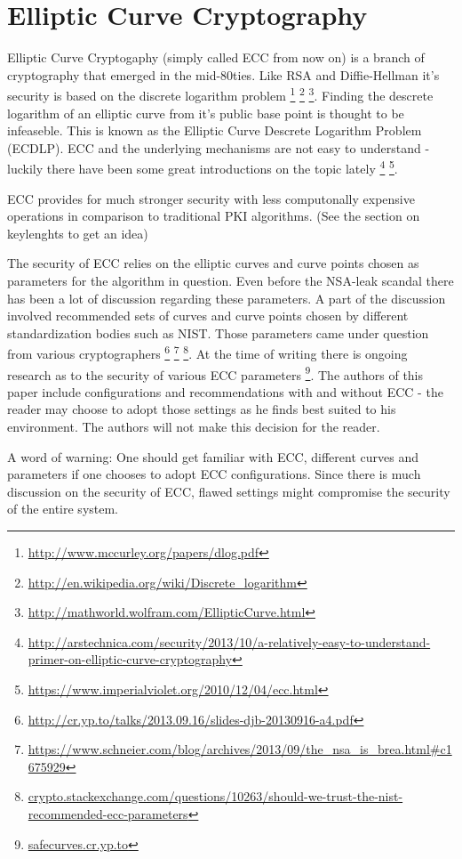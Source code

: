 \section{Elliptic Curve Cryptography}

Elliptic Curve Cryptogaphy (simply called ECC from now on) is a branch of 
cryptography that emerged in the mid-80ties. Like RSA and Diffie-Hellman 
it's security is based on the discrete logarithm problem
\footnote{\url{http://www.mccurley.org/papers/dlog.pdf}} 
\footnote{\url{http://en.wikipedia.org/wiki/Discrete_logarithm}}
\footnote{\url{http://mathworld.wolfram.com/EllipticCurve.html}}.
Finding the descrete logarithm of an elliptic curve from it's public base
point is thought to be infeaseble. This is known as the Elliptic Curve Descrete 
Logarithm Problem (ECDLP). ECC and the underlying mechanisms are not easy 
to understand - luckily there have been some great introductions on the topic lately
\footnote{\url{http://arstechnica.com/security/2013/10/a-relatively-easy-to-understand-primer-on-elliptic-curve-cryptography}}
\footnote{\url{https://www.imperialviolet.org/2010/12/04/ecc.html}}.

ECC provides for much stronger security with less computonally expensive
operations in comparison to traditional PKI algorithms. (See the section 
on keylenghts to get an idea)

The security of ECC relies on the elliptic curves and curve points chosen
as parameters for the algorithm in question. Even before the NSA-leak scandal
there has been a lot of discussion regarding these parameters. A part of the
discussion involved recommended sets of curves and curve points chosen by
different standardization bodies such as NIST. Those parameters came under
question from various cryptographers
\footnote{\url{http://cr.yp.to/talks/2013.09.16/slides-djb-20130916-a4.pdf}}
\footnote{\url{https://www.schneier.com/blog/archives/2013/09/the_nsa_is_brea.html\#c1675929}}
\footnote{\url{crypto.stackexchange.com/questions/10263/should-we-trust-the-nist-recommended-ecc-parameters}}.
At the time of writing there is ongoing research as to the security of 
various ECC parameters
\footnote{\url{safecurves.cr.yp.to}}.
The authors of this paper include configurations and recommendations
with and without ECC - the reader may choose to adopt those settings
as he finds best suited to his environment. The authors will not make
this decision for the reader.

A word of warning: One should get familiar with ECC, different curves and
parameters if one chooses to adopt ECC configurations. Since there is much 
discussion on the security of ECC, flawed settings might compromise the 
security of the entire system. %



